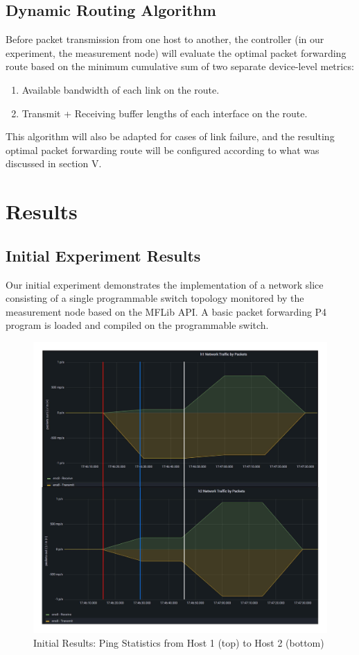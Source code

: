 \documentclass[conference]{IEEEtran}
\begin{document}
    \subsection{Dynamic Routing Algorithm}
      Before packet transmission from one host to another, the controller (in our experiment, the measurement node) will evaluate the optimal packet forwarding route based on the minimum cumulative sum of two separate device-level metrics:
      \begin{enumerate}
          \item Available bandwidth of each link on the route. 
          \item Transmit + Receiving buffer lengths of each interface on the route.
      \end{enumerate}
      This algorithm will also be adapted for cases of link failure, and the resulting optimal packet forwarding route will be configured according to what was discussed in section V.

    \section{Results}
    \subsection{Initial Experiment Results}
    Our initial experiment demonstrates the implementation of a network slice consisting of a single programmable switch topology monitored by the measurement node based on the MFLib API. A basic packet forwarding P4 program is loaded and compiled on the programmable switch.
    \begin{figure}[b]
        \includegraphics[scale=0.4]{packetgraph.jpeg}
        \centering
        \caption{Initial Results: Ping Statistics from Host 1 (top) to Host 2 (bottom)}
    \end{figure}
    
\end{document}
